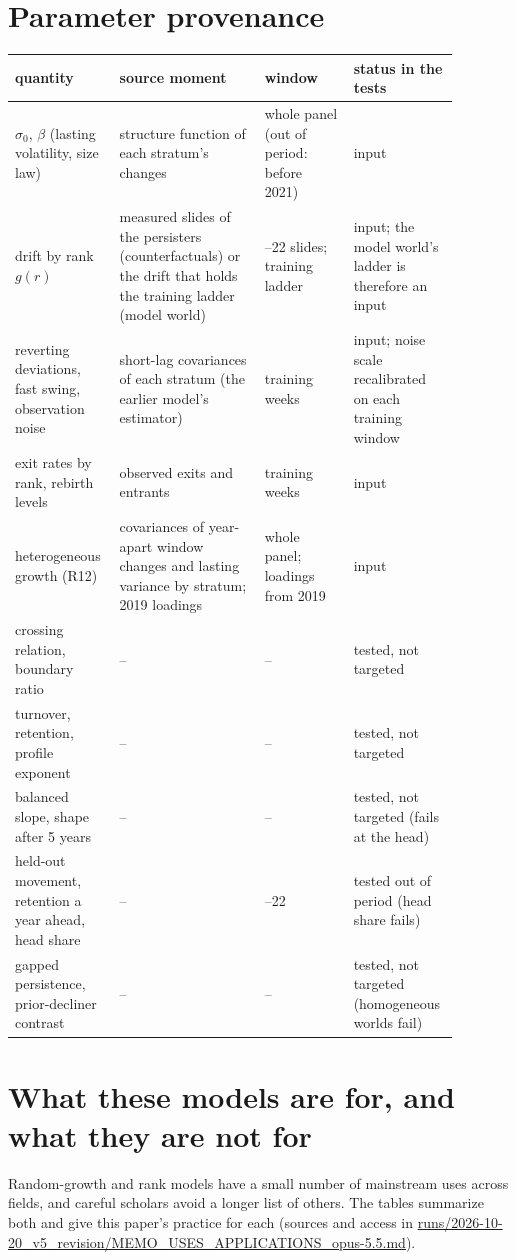 \documentclass[10pt]{article}
\begin{document}
\section{Parameter provenance}
\begin{center}\footnotesize\begin{tabular}{>{\raggedright\arraybackslash}p{0.2\linewidth}>{\raggedright\arraybackslash}p{0.31\linewidth}>{\raggedright\arraybackslash}p{0.19\linewidth}>{\raggedright\arraybackslash}p{0.18\linewidth}}
\toprule
quantity & source moment & window & status in the tests\\
\midrule
$\sigma_0$, $\beta$ (lasting volatility, size law) & structure function of each stratum's changes & whole panel (out of period: before 2021) & input \\
drift by rank $g(r)$ & measured slides of the persisters (counterfactuals) or the drift that holds the training ladder (model world) & 2020--22 slides; training ladder & input; the model world's ladder is therefore an input \\
reverting deviations, fast swing, observation noise & short-lag covariances of each stratum (the earlier model's estimator) & training weeks & input; noise scale recalibrated on each training window \\
exit rates by rank, rebirth levels & observed exits and entrants & training weeks & input \\
heterogeneous growth (R12) & covariances of year-apart window changes and lasting variance by stratum; 2019 loadings & whole panel; loadings from 2019 & input \\
\midrule
crossing relation, boundary ratio & -- & -- & tested, not targeted \\
turnover, retention, profile exponent & -- & -- & tested, not targeted \\
balanced slope, shape after 5 years & -- & -- & tested, not targeted (fails at the head) \\
held-out movement, retention a year ahead, head share & -- & 2021--22 & tested out of period (head share fails) \\
gapped persistence, prior-decliner contrast & -- & -- & tested, not targeted (homogeneous worlds fail) \\
\bottomrule
\end{tabular}\end{center}

\section{What these models are for, and what they are not for}\label{sec:uses}
Random-growth and rank models have a small number of mainstream uses across fields, and careful scholars avoid a longer list of others. The tables summarize both and give this paper's practice for each (sources and access in \url{runs/2026-10-20_v5_revision/MEMO_USES_APPLICATIONS_opus-5.5.md}).
\end{document}
